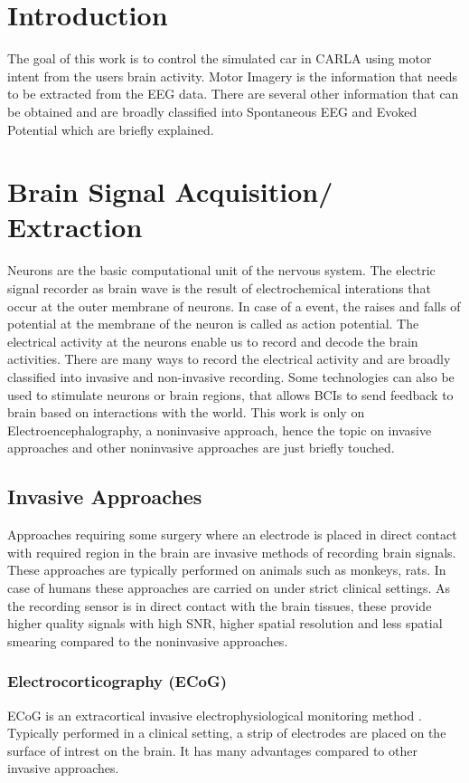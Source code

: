 \section*{Introduction}
    The goal of this work is to control the simulated car in CARLA using motor intent from the users brain activity. Motor Imagery is the information that needs 
to be extracted from the EEG data. There are several other information that can be  obtained and are broadly classified into Spontaneous EEG and Evoked Potential which are 
briefly explained.

\section{Brain Signal Acquisition/ Extraction}
Neurons are the basic computational unit of the nervous system. The electric signal recorder as brain wave is the result of electrochemical interations
that occur at the outer membrane of neurons. In case of a event, the raises and falls of potential at the membrane of the neuron is called as action potential.
The electrical activity at the neurons enable us to record and decode the brain activities. There are many ways to record the electrical activity and 
are broadly classified into invasive and non-invasive recording. Some technologies can also be used to stimulate neurons or brain regions, that allows BCIs
to send feedback to brain based on interactions with the world. This work is only on Electroencephalography, a  noninvasive approach, hence the topic on
invasive approaches and other noninvasive approaches are just briefly touched.

    \subsection{Invasive Approaches}
Approaches requiring some surgery where an electrode is placed in direct contact with required region in the brain are invasive methods of recording 
brain signals. These approaches are typically performed on animals such as monkeys, rats. In case of humans these approaches are carried on under strict
clinical settings. As the recording sensor is in direct contact with the brain tissues, these provide higher quality signals with high SNR, higher spatial 
resolution and less spatial smearing compared to the noninvasive approaches.

    \subsubsection{Electrocorticography (ECoG)}
    ECoG is an extracortical invasive electrophysiological monitoring method \cite{2021}. Typically performed in a clinical setting, a strip of electrodes
are placed on the surface of intrest on the brain. It has many advantages compared to other invasive approaches.

